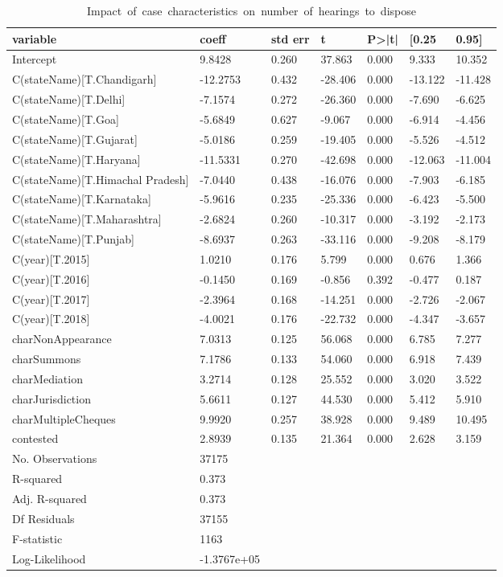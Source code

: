 {\footnotesize
  \begin{longtable}{@{}lllllll@{}}
\caption{\mbox{Impact of case characteristics on number of hearings to dispose}}
\label{tab:hearings_reg}\\
\toprule
variable & coeff & std err & t & P>|t| & [0.25 & 0.95] \\\midrule
\endhead
%
Intercept & 9.8428 & 0.260 & 37.863 & 0.000 & 9.333 & 10.352 \\
C(stateName)[T.Chandigarh] & -12.2753 & 0.432 & -28.406 & 0.000 & -13.122 & -11.428 \\
C(stateName)[T.Delhi] & -7.1574 & 0.272 & -26.360 & 0.000 & -7.690 & -6.625 \\
C(stateName)[T.Goa] & -5.6849 & 0.627 & -9.067 & 0.000 & -6.914 & -4.456 \\
C(stateName)[T.Gujarat] & -5.0186 & 0.259 & -19.405 & 0.000 & -5.526 & -4.512 \\
C(stateName)[T.Haryana] & -11.5331 & 0.270 & -42.698 & 0.000 & -12.063 & -11.004 \\
C(stateName)[T.Himachal Pradesh] & -7.0440 & 0.438 & -16.076 & 0.000 & -7.903 & -6.185 \\
C(stateName)[T.Karnataka] & -5.9616 & 0.235 & -25.336 & 0.000 & -6.423 & -5.500 \\
C(stateName)[T.Maharashtra] & -2.6824 & 0.260 & -10.317 & 0.000 & -3.192 & -2.173 \\
C(stateName)[T.Punjab] & -8.6937 & 0.263 & -33.116 & 0.000 & -9.208 & -8.179 \\
C(year)[T.2015] & 1.0210 & 0.176 & 5.799 & 0.000 & 0.676 & 1.366 \\
C(year)[T.2016] & -0.1450 & 0.169 & -0.856 & 0.392 & -0.477 & 0.187 \\
C(year)[T.2017] & -2.3964 & 0.168 & -14.251 & 0.000 & -2.726 & -2.067 \\
C(year)[T.2018] & -4.0021 & 0.176 & -22.732 & 0.000 & -4.347 & -3.657 \\
charNonAppearance & 7.0313 & 0.125 & 56.068 & 0.000 & 6.785 & 7.277 \\
charSummons & 7.1786 & 0.133 & 54.060 & 0.000 & 6.918 & 7.439 \\
charMediation & 3.2714 & 0.128 & 25.552 & 0.000 & 3.020 & 3.522 \\
charJurisdiction & 5.6611 & 0.127 & 44.530 & 0.000 & 5.412 & 5.910 \\
charMultipleCheques & 9.9920 & 0.257 & 38.928 & 0.000 & 9.489 & 10.495 \\
contested & 2.8939 & 0.135 & 21.364 & 0.000 & 2.628 & 3.159\\
\bottomrule
No. Observations & 37175 & & & & &\\
R-squared & 0.373 & & & & & \\
Adj. R-squared& 0.373& & & & & \\
Df Residuals& 37155 & & & & &\\
F-statistic & 1163 & & & & & \\
Log-Likelihood & -1.3767e+05 & & & & & \\
\bottomrule
\end{longtable}}

